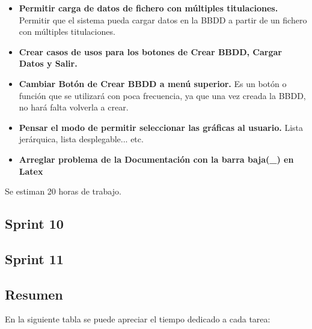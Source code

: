 \begin{itemize}
\item
\textbf{Permitir carga de datos de fichero con múltiples titulaciones.} Permitir que el sistema pueda cargar datos en la BBDD a partir de un fichero con múltiples titulaciones.
\item
\textbf{Crear casos de usos para los botones de Crear BBDD, Cargar Datos y Salir.}
\item
\textbf{Cambiar Botón de Crear BBDD a menú superior.} Es un botón o función que se utilizará con poca frecuencia, ya que una vez creada la BBDD, no hará falta volverla a crear.
\item
\textbf{Pensar el modo de permitir seleccionar las gráficas al usuario.} Lista jerárquica, lista desplegable... etc.
\item
\textbf{Arreglar problema de la Documentación con la barra baja(\_) en Latex}
\end{itemize}

Se estiman 20 horas de trabajo.

\subsection{Sprint 10}
\subsection{Sprint 11}


\subsection{Resumen}
En la siguiente tabla se puede apreciar el tiempo dedicado a cada tarea:


